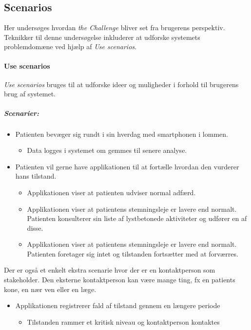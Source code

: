 \subsection{Scenarios}
Her undersøges hvordan \textit{the Challenge} bliver set fra brugerens perspektiv.
Teknikker til denne undersøgelse inkluderer at udforske systemets problemdomæne ved hjælp af \textit{Use scenarios}.

\paragraph{Use scenarios}
\textit{Use scenarios} bruges til at udforske ideer og muligheder i forhold til brugerens brug af systemet.

\subparagraph{Scenarier:}
\begin{itemize}
	\item Patienten bevæger sig rundt i sin hverdag med smartphonen i lommen. 
	\begin{itemize}
		\item Data logges i systemet om gemmes til senere analyse.
	\end{itemize}
	
	\item Patienten vil gerne have applikationen til at fortælle hvordan den vurderer hans tilstand.
	\begin{itemize}
		\item Applikationen viser at patienten udviser normal adfærd.
		\item Applikationen viser at patientens stemningsleje er lavere end normalt.
		Patienten konsulterer sin liste af lystbetonede aktiviteter og udfører en af disse.
		\item Applikationen viser at patientens stemningsleje er lavere end normalt.
		Patienten foretager sig intet og tilstanden fortsætter med at forværres.
	\end{itemize}
\end{itemize}
Der er også et enkelt ekstra scenarie hvor der er en kontaktperson som stakeholder.
Den eksterne kontaktperson kan være mange ting, fx en patients kone, en nær ven eller en læge.
\begin{itemize}
	\item Applikationen registrerer fald af tilstand gennem en længere periode
	\begin{itemize}
		\item Tilstanden rammer et kritisk niveau og kontaktperson kontaktes
	\end{itemize}
\end{itemize}

